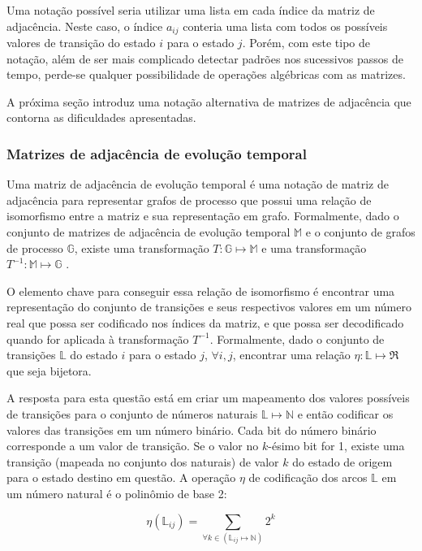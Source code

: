 \documentclass[12pt,a4paper]{article}
\begin{document}
Uma notação possível seria utilizar uma lista em cada índice da matriz de
adjacência. Neste caso, o índice $a_{ij}$ conteria uma lista com todos
os possíveis valores de transição do estado $i$ para o estado $j$.
Porém, com este tipo de notação, além de ser mais complicado
detectar padrões nos sucessivos passos de tempo, perde-se qualquer possibilidade
de operações algébricas com as matrizes.

A próxima seção introduz uma notação alternativa de matrizes de
adjacência que contorna as dificuldades apresentadas.

\subsubsection{Matrizes de adjacência de evolução temporal}

Uma matriz de adjacência de evolução temporal é uma notação de matriz de
adjacência para representar grafos de processo que possui uma relação
de isomorfismo entre a matriz e sua representação em grafo.
Formalmente, dado o conjunto de matrizes de adjacência
de evolução temporal $\mathbb{M}$ e o conjunto de grafos de processo $\mathbb{G}$,
existe uma transformação $T: \mathbb{G} \mapsto \mathbb{M}$ e uma
transformação $T^{-1}: \mathbb{M} \mapsto \mathbb{G}$ .

O elemento chave para conseguir essa relação de isomorfismo
é encontrar uma representação do conjunto de transições e
seus respectivos valores em um número real que possa ser codificado
nos índices da matriz, e que possa ser decodificado quando for
aplicada à transformação $T^{-1}$. Formalmente, dado o conjunto de transições
$\mathbb{L}$ do estado $i$ para o estado $j$, $\forall i,j$, encontrar uma
relação $\eta:\mathbb{L} \mapsto \Re$ que seja bijetora.

A resposta para esta questão está em criar um mapeamento dos valores
possíveis de transições para o conjunto de números naturais
$\mathbb{L} \mapsto \mathbb{N}$ e então codificar os valores das transições
em um número binário. Cada bit do número binário corresponde a um valor de
transição. Se o valor no $k$-ésimo bit for 1, existe uma
transição (mapeada no conjunto dos naturais) de valor $k$ do estado de
origem para o estado destino em questão. A operação $\eta$ de codificação dos
arcos $\mathbb{L}$ em um número natural é o polinômio de base 2:

\begin{equation}
\eta(\mathbb{L}_{ij}) = \sum_{\forall k \in (\mathbb{L}_{ij} \mapsto \mathbb{N})} 2^k
\end{equation}
\end{document}
